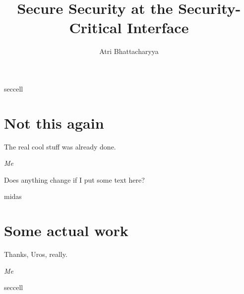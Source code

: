 \documentclass[lablogo]{thesis}
\title{Secure Security at the Security-Critical Interface}
\author{Atri Bhattacharyya}
\begin{document}



\begin{namedscope}{seccell}
\chapter{Not this again}
\label{ch:seccells}
\epigraph{The real cool stuff was already done.}%
        {\textit{Me}}

Does anything change if I put some text here?


\end{namedscope}

\begin{namedscope}{midas}
  \chapter{Some actual work}
  \label{ch:midas}
  \epigraph{Thanks, Uros, really.}%
          {\textit{Me}}


\end{namedscope}

\appendices

\begin{namedscope}{seccell}

\end{namedscope}


\backmatter


{}

\end{document}

